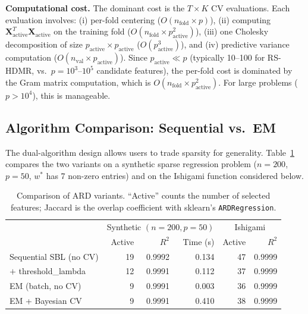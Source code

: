 \documentclass[11pt,a4paper]{article}
\begin{document}
\textbf{Computational cost.} The dominant cost is the $T \times K$ CV evaluations. Each evaluation involves: (i) per-fold centering ($O(n_{\text{fold}} \times p)$), (ii) computing $\mathbf{X}_{\text{active}}^T \mathbf{X}_{\text{active}}$ on the training fold ($O(n_{\text{fold}} \times p_{\text{active}}^2)$), (iii) one Cholesky decomposition of size $p_{\text{active}} \times p_{\text{active}}$ ($O(p_{\text{active}}^3)$), and (iv) predictive variance computation ($O(n_{\text{val}} \times p_{\text{active}})$). Since $p_{\text{active}} \ll p$ (typically 10--100 for RS-HDMR, vs.\ $p = 10^3$--$10^5$ candidate features), the per-fold cost is dominated by the Gram matrix computation, which is $O(n_{\text{fold}} \times p_{\text{active}}^2)$. For large problems ($p > 10^4$), this is manageable.

\subsection{Algorithm Comparison: Sequential vs.\ EM}

The dual-algorithm design allows users to trade sparsity for generality.  Table~\ref{tab:ard_algo} compares the two variants on a synthetic sparse regression problem ($n=200$, $p=50$, $w^*$ has 7 non-zero entries) and on the Ishigami function considered below.

\begin{table}[H]
\centering
\caption{Comparison of ARD variants.  ``Active'' counts the number of selected features; Jaccard is the overlap coefficient with sklearn's \texttt{ARDRegression}.}
\label{tab:ard_algo}
\begin{tabular}{@{}lrrr|rr@{}}
\toprule
& \multicolumn{3}{c|}{Synthetic $(n{=}200, p{=}50)$} & \multicolumn{2}{c}{Ishigami} \\
& Active & $R^2$ & Time (s) & Active & $R^2$ \\
\midrule
Sequential SBL (no CV)     & 19 & 0.9992 & 0.134 & 47 & 0.9999 \\
$+$ threshold\_lambda       & 12 & 0.9991 & 0.112 & 37 & 0.9999 \\
EM (batch, no CV)          & 9  & 0.9991 & 0.003 & 36 & 0.9999 \\
EM + Bayesian CV           & 9  & 0.9991 & 0.410 & 38 & 0.9999 \\
\bottomrule
\end{tabular}
\end{table}
\end{document}
